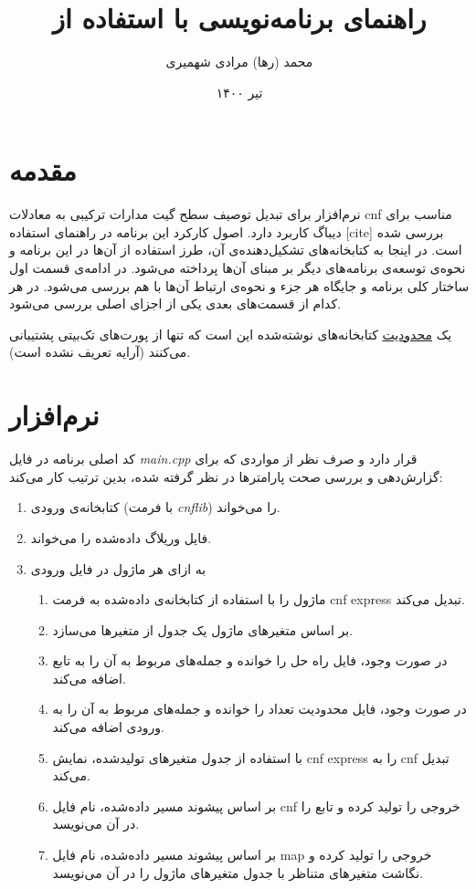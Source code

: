 \documentclass{article}
\title{راهنمای برنامه‌نویسی با استفاده از \lr{uv2cnf}}
\date{تیر ۱۴۰۰}
\author{محمد (رها) مرادی شهمیری\\\lr{raham9619@gmail.com}}
\begin{document}
\maketitle
\newpage
\rl{\tableofcontents}
\newpage


\section{مقدمه}

نرم‌افزار  برای تبدیل توصیف سطح گیت مدارات ترکیبی به معادلات cnf مناسب برای دیباگ کاربرد دارد. اصول کارکرد این برنامه در راهنمای استفاده [cite] بررسی شده است. در اینجا به کتابخانه‌های تشکیل‌دهنده‌ی آن، طرز استفاده از آن‌ها در این برنامه و نحوه‌ی توسعه‌ی برنامه‌های دیگر بر مبنای آن‌ها پرداخته می‌شود. در ادامه‌ی قسمت اول ساختار کلی برنامه و جایگاه هر جزء و نحوه‌ی ارتباط آن‌ها با هم بررسی می‌شود. در هر کدام از قسمت‌های بعدی یکی از اجزای اصلی بررسی می‌شود. 

یک \underline{محدودیت} کتابخانه‌های نوشته‌شده این است که تنها از پورت‌های تک‌بیتی پشتیبانی می‌کنند (آرایه تعریف نشده است). 

\section{نرم‌افزار }

کد اصلی برنامه در فایل \textit{main.cpp} قرار دارد و صرف نظر از مواردی که برای گزارش‌دهی و بررسی صحت پارامترها در نظر گرفته شده، بدین ترتیب کار می‌کند:‌ 
\begin{enumerate}
\item
کتابخانه‌ی ورودی (با فرمت \textit{cnflib}) را می‌خواند. 
\item
فایل وریلاگ داده‌شده را می‌خواند. 
\item
به ازای هر ماژول در فایل ورودی
\begin{enumerate}
\item
ماژول را با استفاده از کتابخانه‌ی داده‌شده به فرمت cnf express تبدیل می‌کند. 
\item
بر اساس متغیرهای ماژول یک جدول از متغیرها می‌سازد.
\item
در صورت وجود، فایل راه حل را خوانده و جمله‌های مربوط به آن را به تابع اضافه می‌کند.
\item
در صورت وجود، فایل محدودیت تعداد را خوانده و جمله‌های مربوط به آن را به ورودی اضافه می‌کند. 
\item
با استفاده از جدول متغیرهای تولیدشده، نمایش cnf express را به cnf تبدیل می‌کند. 
\item
بر اساس پیشوند مسیر داده‌شده، نام فایل cnf خروجی را تولید کرده و تابع را در آن می‌نویسد. 
\item
بر اساس پیشوند مسیر داده‌شده، نام فایل map خروجی را تولید کرده و نگاشت متغیرهای متناظر با جدول متغیرهای ماژول را در آن می‌نویسد. 
\end{enumerate}
\end{enumerate}
\end{document}
